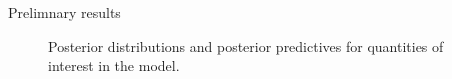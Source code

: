 \documentclass[final]{beamer}
\newlength{\sepwidth}
\newlength{\colwidth}
\newcommand{\separatorcolumn}{\begin{column}{\sepwidth}\end{column}}
\begin{document}
\begin{frame}[t]
\begin{columns}[t]
\begin{column}{\colwidth}
\begin{block}{Prelimnary results}
\begin{center}
\begin{figure}[t!]
\begin{center}
\hfill
{}
\hfill
\end{center}

\caption{Posterior distributions and posterior predictives for quantities of interest in the model.}
\end{figure}
\end{center}

\end{block}


  \end{column}

  \separatorcolumn
  \end{columns}
  \end{frame}

  
\end{document}
